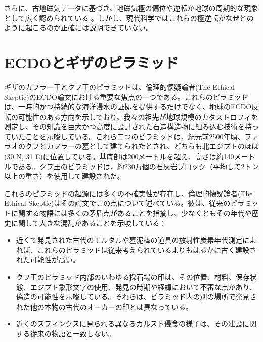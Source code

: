 \documentclass[10pt,twocolumn,letterpaper]{article}
\begin{document}
さらに、古地磁気データに基づき、地磁気極の偏位や逆転が地球の周期的な現象として広く認められている \cite{35,40,41}。しかし、現代科学ではこれらの極逆転がなぜどのように起こるのか正確には説明できていない。

\section{ECDOとギザのピラミッド}

ギザのカフラー王とクフ王のピラミッドは、倫理的懐疑論者(The Ethical Skeptic)のECDO論文\cite{27}における重要な焦点の一つである。これらのピラミッドは、一時的かつ持続的な海洋浸水の証拠を提供するだけでなく、地球のECDO反転の可能性のある方向を示しており、我々の祖先が地球規模のカタストロフィを測定し、その知識を巨大かつ高度に設計された石造構造物に組み込む技術を持っていたことを示唆している。これら二つのピラミッドは、紀元前2500年頃、ファラオのクフとカフラーの墓として建てられたとされ、どちらも北エジプトのほぼ(30 N, 31 E)に位置している。基底部は200メートルを超え、高さは約140メートルである。クフ王のピラミッドは、約230万個の石灰岩ブロック（平均して2トン以上の重さ）を使用して建設された\cite{24, 25}。

これらのピラミッドの起源には多くの不確実性が存在し、倫理的懐疑論者(The Ethical Skeptic)はその論文でこの点について述べている。彼は、従来のピラミッドに関する物語には多くの矛盾点があることを指摘し、少なくともその年代や歴史に関して大きな混乱があることを示唆している：

\begin{flushleft}
\begin{itemize}
    \item 近くで発見された古代のモルタルや墓泥棒の道具の放射性炭素年代測定によれば、これらのピラミッドは従来考えられているよりもはるかに古く建設された可能性が高い。
    \item クフ王のピラミッド内部のいわゆる採石場の印は、その位置、材料、保存状態、エジプト象形文字の使用、発見の時期や経緯において不審な点があり、偽造の可能性を示唆している。それらは、ピラミッド内の別の場所で発見された他の本物の古代のオーカーの印とは異なっている。
    \item 近くのスフィンクスに見られる異なるカルスト侵食の様子は、その建設に関する従来の物語と一致しない。
\end{itemize}
\end{flushleft}
\end{document}
